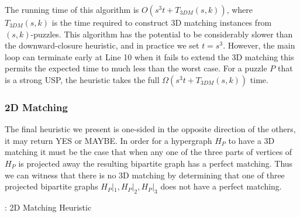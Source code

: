 \documentclass[11pt]{article}
\begin{document}
The running time of this algorithm is $O(s^3 t + T_{3DM}(s,k))$, where
$T_{3DM}(s,k)$ is the time required to construct 3D matching
instances from $(s,k)$-puzzles.  This algorithm has the potential to
be considerably slower than the downward-closure heuristic, and in practice we set $t = s^3$.  However, the main loop can terminate early at Line 10
when it fails to extend the 3D matching this permits the expected time
to much less than the worst case.  For a puzzle $P$ that is a strong
USP, the heuristic takes the full $\Omega(s^3 t + T_{3DM}(s,k))$ time.


\begin{comment}


\subsubsection{Graph Automorphism}

A strong uniquely-solvable puzzle must also be a uniquely-solvable
puzzle.  Given a puzzle $P$ we can construct a graph $G_P$ such that
$G_P$ is rigid iff $P$ is a uniquely-solvable puzzle.

XXX - I don't think this idea worked out.  The code correctly
implemented the approach, but the approach was flawed.  Probably
remove this section or add to future work.

XXXX - I don't remember the argument either way...

\end{comment}

\subsubsection{2D Matching}

The final heuristic we present is one-sided in the opposite direction
of the others, it may return YES or MAYBE.  In order for a hypergraph
$H_P$ to have a 3D
matching it must be the case that when any one of the three parts of
vertices of $H_P$ is projected away the resulting bipartite graph has a
perfect matching.  Thus we can witness that there is no 3D matching by
determining that one of three projected bipartite graphs $H_P|_1, H_P|_2,
H_P|_3$ does not have a perfect matching.

\begin{algorithm}
  \caption{: 2D Matching Heuristic}
  \label{alg:2dm}
\begin{algorithmic}[1]

  \Else
  \EndIf
  \EndFunction
\end{algorithmic}
\end{algorithm}
\end{document}
